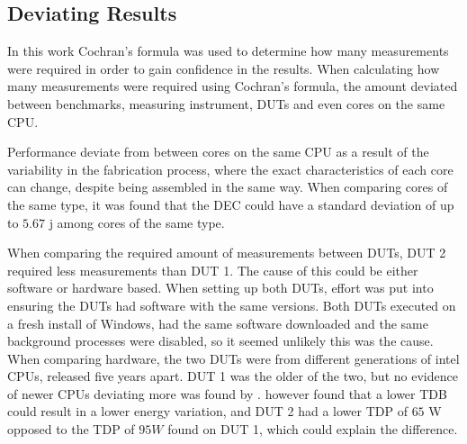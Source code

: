 \subsection{Deviating Results}

In this work Cochran's formula was used to determine how many measurements were required in order to gain confidence in the results. When calculating how many measurements were required using Cochran's formula, the amount deviated between benchmarks, measuring instrument, DUTs and even cores on the same CPU.

Performance deviate from between cores on the same CPU as a result of the variability in the fabrication process, where the exact characteristics of each core can change, despite being assembled in the same way.\cite{Mauzy2020} When comparing cores of the same type, it was found that the DEC could have a standard deviation of up to $5.67$ j among cores of the same type.


When comparing the required amount of measurements between DUTs, DUT 2 required less measurements than DUT 1. The cause of this could be either software or hardware based. When setting up both DUTs, effort was put into ensuring the DUTs had software with the same versions. Both DUTs executed on a fresh install of Windows, had the same software downloaded and the same background processes were disabled, so it seemed unlikely this was the cause. When comparing hardware, the two DUTs were from different generations of intel CPUs, released five years apart. DUT 1 was the older of the two, but no evidence of newer CPUs deviating more was found by \cite{Ournani2020}. \cite{Ournani2020} however found that a lower TDB could result in a lower energy variation, and DUT 2 had a lower TDP of $65$ W opposed to the TDP of $95W$ found on DUT 1, which could explain the difference\cite{IntelComparison}.





